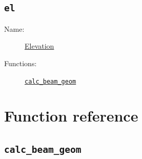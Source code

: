 \documentclass{book}
\begin{document}
\subsection{\texttt{el}}
\begin{description}
    \item[Name:] \hyperlink{sec:coordslocalsky}{Elevation}
    \item[Functions:] \hyperlink{cn:calc_beam_geom}{\texttt{calc\_beam\_geom}}
\end{description}

\section{Function reference}

\subsection{\texttt{calc\_beam\_geom}}
\label{fcn:calc_beam_geom}

\printindex
\end{document}
